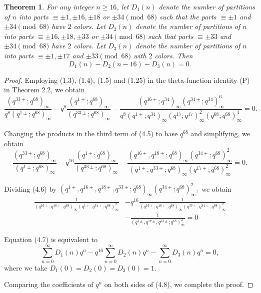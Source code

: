 \documentclass[11pt,a4paper]{article}
\numberwithin{equation}{section}
\theoremstyle{plain}
\newtheorem{theorem}{Theorem}[section]
\begin{document}
    \begin{theorem}
        For any integer $n \geq 16$, let $D_1(n)$ denote the number of partitions of $n$ into parts $\equiv \pm 1, \pm 16, \pm 18$ or $\pm 34 \pmod{68}$ such that the parts $\equiv \pm 1$ and $\pm 34 \pmod{68}$ have $2$ colors. Let $D_2(n)$ denote the number of partitions of $n$ into parts 
        $\equiv \pm 16, \pm 18, \pm 33$ or $\pm 34 \pmod{68}$ such that parts $\equiv \pm 33$ and $\pm 34 \pmod{68}$ have $2$ colors. 
        Let $D_3(n)$ denote the number of partitions of $n$ into parts $\equiv \pm 1, \pm 17$ and $\pm 33 \pmod{68}$ with $2$ colors.
        Then
        \[D_1(n) - D_2(n-16) - D_3(n) = 0.\]
    \end{theorem}
\begin{proof}
Employing (1.3), (1.4), (1.5) and (1.25) in the theta-function identity (P) in Theorem 2.2, we obtain
\begin{equation}
\frac{(q^{33\pm}; q^{68})_{\infty}}{q^{8}(q^{1\pm}; q^{68})_{\infty}}
- q^{8} \frac{(q^{1\pm}; q^{68})_{\infty}}{(q^{33\pm}; q^{68})_{\infty}}
- \frac{(q^{16\pm}; q^{34})_{\infty}(q^{34\pm}; q^{34})_{\infty}^6}
{q^{8}(q^{1\pm}; q^{34})_{\infty}(q^{17}; q^{17})_{\infty}^2 (q^{68}; q^{68})_{\infty}^4}
= 0.
\tag{4.5}
\end{equation}

Changing the products in the third term of (4.5) to base $q^{68}$ and simplifying, we obtain
\begin{equation}
\frac{(q^{33\pm}; q^{68})_{\infty}}{(q^{1\pm}; q^{68})_{\infty}}
- q^{16} \frac{(q^{1\pm}; q^{68})_{\infty}}{(q^{33\pm}; q^{68})_{\infty}}
- \frac{(q^{16\pm}, q^{18\pm}; q^{68})_{\infty}(q^{34\pm}; q^{68})_{\infty}^2}
{(q^{1\pm}, q^{33\pm}; q^{68})_{\infty}(q^{17\pm}; q^{68})_{\infty}^2}
= 0.
\tag{4.6}
\end{equation}

Dividing (4.6) by 
$(q^{1\pm}, q^{16\pm}, q^{18\pm}, q^{33\pm}; q^{68})_{\infty}
(q^{34\pm}; q^{68})_{\infty}^2 ,$ we obtain
\begin{align}
	\frac{1}{(q^{16\pm}, q^{18\pm}; q^{68})_{\infty}(q^{1\pm}, q^{34\pm}; q^{68})_{\infty}^2}
	&- q^{16} \frac{1}{(q^{16\pm}, q^{18\pm}; q^{68})_{\infty}(q^{33\pm}, q^{34\pm}; q^{68})_{\infty}^2} \\
	&- \frac{1}{(q^{1\pm}, q^{17\pm}, q^{33\pm}; q^{68})_{\infty}^2} = 0
	\tag{4.7}
\end{align}

Equation (4.7) is equivalent to
\begin{equation}
\sum_{n=0}^{\infty} D_1(n) q^n
- q^{16} \sum_{n=0}^{\infty} D_2(n) q^n
- \sum_{n=0}^{\infty} D_3(n) q^n
= 0,
\tag{4.8}
\end{equation}
where we take $D_1(0) = D_2(0) = D_3(0) = 1$.

Comparing the coefficients of $q^n$ on both sides of (4.8), we complete the proof.
\end{proof}
\end{document}
